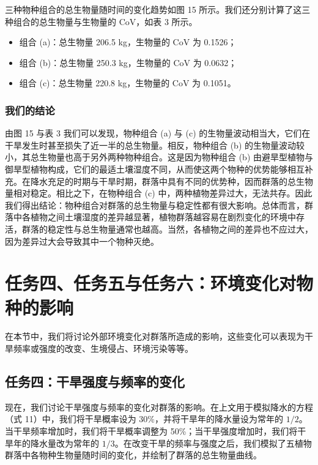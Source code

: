 \documentclass[11pt,a4paper]{ctexart}
\begin{document}
三种物种组合的总生物量随时间的变化趋势如图 15 所示。我们还分别计算了这三种组合的总生物量与生物量的 CoV，如表 3 所示。

\begin{itemize}
\item 组合 (a)：总生物量 206.5 kg，生物量的 CoV 为 0.1526；
\item 组合 (b)：总生物量 250.3 kg，生物量的 CoV 为 0.0632；
\item 组合 (c)：总生物量 220.8 kg，生物量的 CoV 为 0.1051。
\end{itemize}

\subsubsection{我们的结论}

由图 15 与表 3 我们可以发现，物种组合 (a) 与 (c) 的生物量波动相当大，它们在干旱发生时甚至损失了近一半的总生物量。相反，物种组合 (b) 的生物量波动较小，其总生物量也高于另外两种物种组合。这是因为物种组合 (b) 由避旱型植物与御旱型植物构成，它们的最适土壤湿度不同，从而使这两个物种的优势能够相互补充。在降水充足的时期与干旱时期，群落中具有不同的优势种，因而群落的总生物量相对稳定。相比之下，在物种组合 (c) 中，两种植物差异过大，无法共存。因此我们得出结论：物种组合对群落的总生物量与稳定性都有很大影响。总体而言，群落中各植物之间土壤湿度的差异越显著，植物群落越容易在剧烈变化的环境中存活，群落的稳定性与总生物量通常也越高。当然，各植物之间的差异也不应过大，因为差异过大会导致其中一个物种灭绝。

\section{任务四、任务五与任务六：环境变化对物种的影响}

在本节中，我们将讨论外部环境变化对群落所造成的影响，这些变化可以表现为干旱频率或强度的改变、生境侵占、环境污染等等。

\subsection{任务四：干旱强度与频率的变化}

现在，我们讨论干旱强度与频率的变化对群落的影响。在上文用于模拟降水的方程（式 11）中，我们将干旱概率设为 30\%，并将干旱年的降水量设为常年的 $1/2$。当干旱频率增加时，我们将干旱概率调整为 50\%；当干旱强度增加时，我们将干旱年的降水量改为常年的 $1/3$。在改变干旱的频率与强度之后，我们模拟了五植物群落中各物种生物量随时间的变化，并绘制了群落的总生物量曲线。
\end{document}
